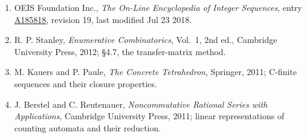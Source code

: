\documentclass[11pt]{article}
\theoremstyle{definition}
\begin{document}
\begin{enumerate}

\item OEIS Foundation Inc., \emph{The On-Line Encyclopedia of Integer Sequences}, entry \href{https://oeis.org/A185818}{A185818}, revision 19, last modified Jul 23 2018.

\item R. P. Stanley, \emph{Enumerative Combinatorics}, Vol.~1, 2nd ed., Cambridge University Press, 2012; \S4.7, the transfer-matrix method.

\item M. Kauers and P. Paule, \emph{The Concrete Tetrahedron}, Springer, 2011; C-finite sequences and their closure properties.

\item J. Berstel and C. Reutenauer, \emph{Noncommutative Rational Series with Applications}, Cambridge University Press, 2011; linear representations of counting automata and their reduction.

\end{enumerate}
\end{document}
